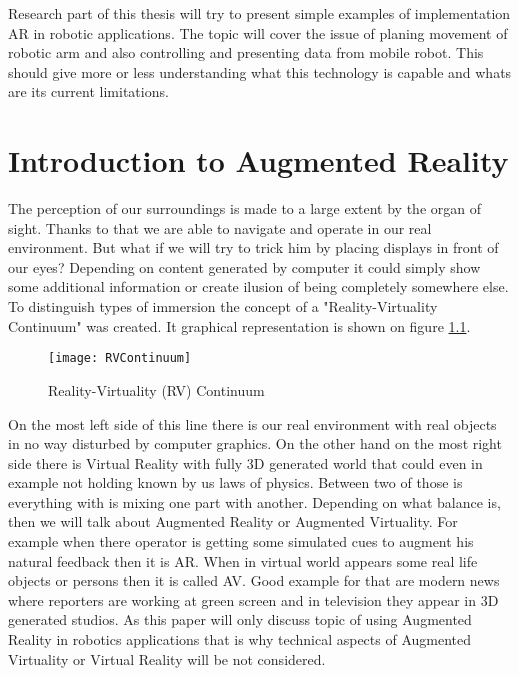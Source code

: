 \documentclass[printmode,en]{mgr}
\begin{document}
Research part of this thesis will try to present simple examples of implementation AR in robotic applications. The topic will cover the issue of planing movement of robotic arm and also controlling and presenting data from mobile robot. This should give more or less understanding what this technology is capable and whats are its current limitations.


\chapter{Introduction to Augmented Reality}
The perception of our surroundings is made to a large extent by the organ of sight. Thanks to that we are able to navigate and operate in our real environment. But what if we will try to trick him by placing displays in front of our eyes? Depending on content generated by computer it could simply show some additional information or create ilusion of being completely somewhere else. To distinguish types of immersion the concept of a "Reality-Virtuality Continuum" was created. It graphical representation is shown on figure \ref{fig:RVContinuum}.

\begin{figure}[!ht]
  \centering
    \texttt{[image: RVContinuum]}
  \caption{Reality-Virtuality (RV) Continuum}
  \label{fig:RVContinuum}
\end{figure}

On the most left side of this line there is our real environment with real objects in no way disturbed by computer graphics. On the other hand on the most right side there is Virtual Reality with fully 3D generated world that could even in example not holding known by us laws of physics. Between two of those is everything with is mixing one part with another. Depending on what balance is, then we will talk about Augmented Reality or Augmented Virtuality. For example when there operator is getting some simulated cues to augment his natural feedback then it is AR. When in virtual world appears some real life objects or persons then it is called AV. Good example for that are modern news where reporters are working at green screen and in television they appear in 3D generated studios. As this paper will only discuss topic of using Augmented Reality in robotics applications that is why technical aspects of Augmented Virtuality or Virtual Reality will be not considered.
\end{document}
